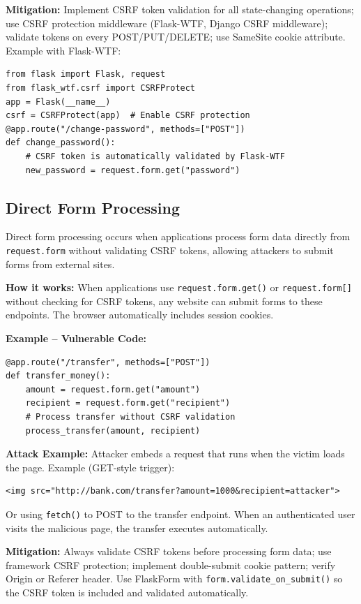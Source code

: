 \textbf{Mitigation:} Implement CSRF token validation for all state-changing operations; use CSRF protection middleware (Flask-WTF, Django CSRF middleware); validate tokens on every POST/PUT/DELETE; use SameSite cookie attribute. Example with Flask-WTF:

\begin{lstlisting}[style=pycode]
from flask import Flask, request
from flask_wtf.csrf import CSRFProtect
app = Flask(__name__)
csrf = CSRFProtect(app)  # Enable CSRF protection
@app.route("/change-password", methods=["POST"])
def change_password():
    # CSRF token is automatically validated by Flask-WTF
    new_password = request.form.get("password")
\end{lstlisting}

\subsection{Direct Form Processing}
\label{sec:csrf_direct_form}

Direct form processing occurs when applications process form data directly from \texttt{request.form} without validating CSRF tokens, allowing attackers to submit forms from external sites.

\textbf{How it works:} When applications use \texttt{request.form.get()} or \texttt{request.form[]} without checking for CSRF tokens, any website can submit forms to these endpoints. The browser automatically includes session cookies.

\textbf{Example -- Vulnerable Code:}

\begin{lstlisting}[style=pycode]
@app.route("/transfer", methods=["POST"])
def transfer_money():
    amount = request.form.get("amount")
    recipient = request.form.get("recipient")
    # Process transfer without CSRF validation
    process_transfer(amount, recipient)
\end{lstlisting}

\textbf{Attack Example:} Attacker embeds a request that runs when the victim loads the page. Example (GET-style trigger):
\begin{lstlisting}[style=attackcode]
<img src="http://bank.com/transfer?amount=1000&recipient=attacker">
\end{lstlisting}
Or using \texttt{fetch()} to POST to the transfer endpoint. When an authenticated user visits the malicious page, the transfer executes automatically.

\textbf{Mitigation:} Always validate CSRF tokens before processing form data; use framework CSRF protection; implement double-submit cookie pattern; verify Origin or Referer header. Use FlaskForm with \texttt{form.validate\_on\_submit()} so the CSRF token is included and validated automatically.

